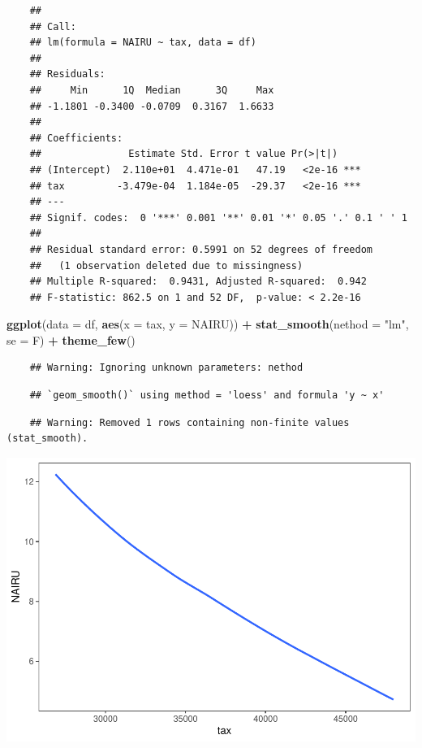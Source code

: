 \documentclass[11pt, a4paper]{report}
\newenvironment{Shaded}{\begin{snugshade}}{\end{snugshade}}
\newcommand{\DataTypeTok}[1]{\textcolor[rgb]{0.13,0.29,0.53}{#1}}
\newcommand{\KeywordTok}[1]{\textcolor[rgb]{0.13,0.29,0.53}{\textbf{#1}}}
\newcommand{\NormalTok}[1]{#1}
\newcommand{\OperatorTok}[1]{\textcolor[rgb]{0.81,0.36,0.00}{\textbf{#1}}}
\newcommand{\StringTok}[1]{\textcolor[rgb]{0.31,0.60,0.02}{#1}}
\theoremstyle{plain}
\theoremstyle{plain}
\theoremstyle{remark}
\begin{document}
\begin{verbatim}
	## 
	## Call:
	## lm(formula = NAIRU ~ tax, data = df)
	## 
	## Residuals:
	##     Min      1Q  Median      3Q     Max 
	## -1.1801 -0.3400 -0.0709  0.3167  1.6633 
	## 
	## Coefficients:
	##               Estimate Std. Error t value Pr(>|t|)    
	## (Intercept)  2.110e+01  4.471e-01   47.19   <2e-16 ***
	## tax         -3.479e-04  1.184e-05  -29.37   <2e-16 ***
	## ---
	## Signif. codes:  0 '***' 0.001 '**' 0.01 '*' 0.05 '.' 0.1 ' ' 1
	## 
	## Residual standard error: 0.5991 on 52 degrees of freedom
	##   (1 observation deleted due to missingness)
	## Multiple R-squared:  0.9431, Adjusted R-squared:  0.942 
	## F-statistic: 862.5 on 1 and 52 DF,  p-value: < 2.2e-16
\end{verbatim}

\begin{Shaded}
	\begin{Highlighting}[]
		\KeywordTok{ggplot}\NormalTok{(}\DataTypeTok{data =}\NormalTok{ df, }\KeywordTok{aes}\NormalTok{(}\DataTypeTok{x =}\NormalTok{ tax, }\DataTypeTok{y =}\NormalTok{ NAIRU)) }\OperatorTok{+}\StringTok{ }\KeywordTok{stat_smooth}\NormalTok{(}\DataTypeTok{nethod =} \StringTok{"lm"}\NormalTok{, }
		\DataTypeTok{se =}\NormalTok{ F) }\OperatorTok{+}\StringTok{ }\KeywordTok{theme_few}\NormalTok{()}
	\end{Highlighting}
\end{Shaded}

\begin{verbatim}
	## Warning: Ignoring unknown parameters: nethod
\end{verbatim}

\begin{verbatim}
	## `geom_smooth()` using method = 'loess' and formula 'y ~ x'
\end{verbatim}

\begin{verbatim}
	## Warning: Removed 1 rows containing non-finite values (stat_smooth).
\end{verbatim}

\begin{center}\includegraphics{Econo2_P5_files/figure-latex/loading data pme-2} \end{center}
\end{document}
